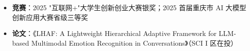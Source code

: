 \documentclass[10pt]{article}
\begin{document}

    \section[在校成果]{}
    \begin{itemize}
        \item \textbf{竞赛}：2025 "互联网+"大学生创新创业大赛银奖；2025 首届重庆市 AI 大模型创新应用大赛省级三等奖
        \item \textbf{论文}：《LHAF: A Lightweight Hierarchical Adaptive Framework for LLM-based Multimodal Emotion Recognition in Conversations》（SCI I 区在投）
    \end{itemize}
\end{document}
